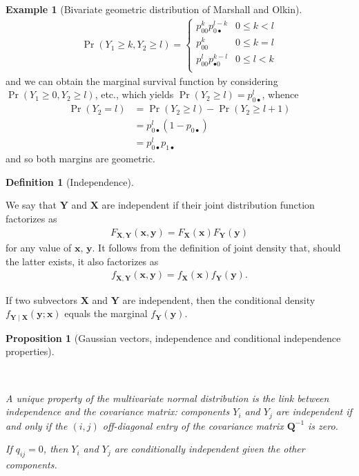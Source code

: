 \documentclass[
  11pt,
  letterpaper,
]{scrbook}
\theoremstyle{definition}
\theoremstyle{plain}
\newtheorem{proposition}{Proposition}[chapter]
\theoremstyle{plain}
\theoremstyle{definition}
\newtheorem{example}{Example}[chapter]
\theoremstyle{definition}
\newtheorem{definition}{Definition}[chapter]
\theoremstyle{remark}
\begin{document}
\begin{example}[Bivariate geometric distribution of Marshall and
Olkin]
\begin{align*}
\Pr(Y_1 \ge k, Y_2 \ge l) = \begin{cases}
p_{00}^k p_{0 \bullet}^{l-k} & 0\leq k < l\\
p_{00}^k & 0 \leq k=l \\
p_{00}^l p_{\bullet 0}^{k-l} & 0\leq l < k\\
\end{cases}
\end{align*} and we can obtain the marginal survival function by
considering \(\Pr(Y_1 \ge 0, Y_2 \ge l)\), etc., which yields
\(\Pr(Y_2 \ge l) = p_{0 \bullet}^{l}\), whence \begin{align*}
\Pr(Y_2 = l) &= \Pr(Y_2 \ge l) -\Pr(Y_2 \ge l+1)
\\&= p_{0 \bullet}^{l} (1-p_{0 \bullet})
 \\&=p_{0 \bullet}^{l}p_{1\bullet}
\end{align*} and so both margins are geometric.

\end{example}

\begin{definition}[Independence]\protect\hypertarget{def-independence}{}\label{def-independence}

We say that \(\boldsymbol{Y}\) and \(\boldsymbol{X}\) are independent if
their joint distribution function factorizes as \begin{align*}
F_{\boldsymbol{X}, \boldsymbol{Y}}(\boldsymbol{x}, \boldsymbol{y}) = F_{\boldsymbol{X}}(\boldsymbol{x})F_{\boldsymbol{Y}}(\boldsymbol{y})
\end{align*} for any value of \(\boldsymbol{x}\), \(\boldsymbol{y}\). It
follows from the definition of joint density that, should the latter
exists, it also factorizes as \begin{align*}
f_{\boldsymbol{X}, \boldsymbol{Y}}(\boldsymbol{x}, \boldsymbol{y}) = f_{\boldsymbol{X}}(\boldsymbol{x})f_{\boldsymbol{Y}}(\boldsymbol{y}).
\end{align*}

If two subvectors \(\boldsymbol{X}\) and \(\boldsymbol{Y}\) are
independent, then the conditional density
\(f_{\boldsymbol{Y} \mid \boldsymbol{X}}(\boldsymbol{y}; \boldsymbol{x})\)
equals the marginal \(f_{\boldsymbol{Y}}(\boldsymbol{y})\).

\end{definition}

\begin{proposition}[Gaussian vectors, independence and conditional
independence
properties]\protect\hypertarget{prp-independence}{}\label{prp-independence}

~

A unique property of the multivariate normal distribution is the link
between independence and the covariance matrix: components \(Y_i\) and
\(Y_j\) are independent if and only if the \((i,j)\) off-diagonal entry
of the covariance matrix \(\boldsymbol{Q}^{-1}\) is zero.

If \(q_{ij}=0\), then \(Y_i\) and \(Y_j\) are conditionally independent
given the other components.

\end{proposition}
\end{document}
